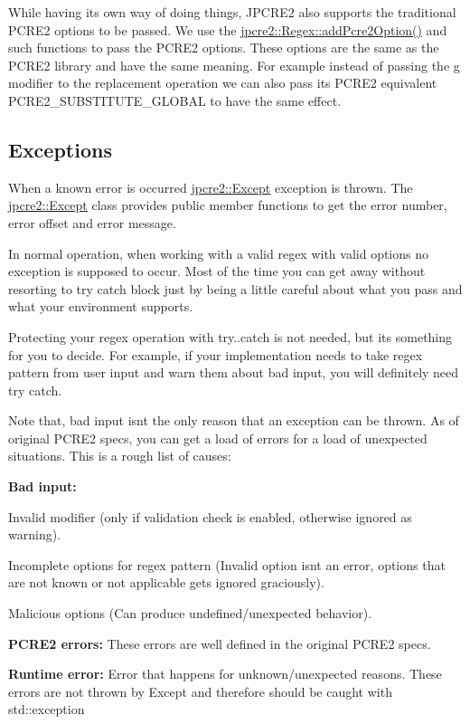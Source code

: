 While having its own way of doing things, J\+P\+C\+R\+E2 also supports the traditional P\+C\+R\+E2 options to be passed. We use the {\ttfamily \hyperlink{classjpcre2_1_1Regex_a2c7dcf12f26b2b046e147b013c8b5087_a2c7dcf12f26b2b046e147b013c8b5087}{jpcre2\+::\+Regex\+::add\+Pcre2\+Option()}} and such functions to pass the P\+C\+R\+E2 options. These options are the same as the P\+C\+R\+E2 library and have the same meaning. For example instead of passing the \textquotesingle{}g\textquotesingle{} modifier to the replacement operation we can also pass its P\+C\+R\+E2 equivalent {\ttfamily P\+C\+R\+E2\+\_\+\+S\+U\+B\+S\+T\+I\+T\+U\+T\+E\+\_\+\+G\+L\+O\+B\+AL} to have the same effect.\hypertarget{index_exceptions}{}\subsection{Exceptions}\label{index_exceptions}
When a known error is occurred \hyperlink{classjpcre2_1_1Except}{jpcre2\+::\+Except} exception is thrown. The \hyperlink{classjpcre2_1_1Except}{jpcre2\+::\+Except} class provides public member functions to get the error number, error offset and error message.

In normal operation, when working with a valid regex with valid options no exception is supposed to occur. Most of the time you can get away without resorting to try catch block just by being a little careful about what you pass and what your environment supports.

Protecting your regex operation with try..catch is not needed, but it\textquotesingle{}s something for you to decide. For example, if your implementation needs to take regex pattern from user input and warn them about bad input, you will definitely need try catch.

Note that, bad input isn\textquotesingle{}t the only reason that an exception can be thrown. As of original P\+C\+R\+E2 specs, you can get a load of errors for a load of unexpected situations. This is a rough list of causes\+:


\begin{DoxyEnumerate}
\item {\bfseries Bad input\+:}
\begin{DoxyEnumerate}
\item Invalid modifier (only if validation check is enabled, otherwise ignored as warning).
\item Incomplete options for regex pattern (Invalid option isn\textquotesingle{}t an error, options that are not known or not applicable gets ignored graciously).
\item Malicious options (Can produce undefined/unexpected behavior).
\end{DoxyEnumerate}
\item {\bfseries P\+C\+R\+E2 errors\+:} These errors are well defined in the original P\+C\+R\+E2 specs.
\item {\bfseries Runtime error\+:} Error that happens for unknown/unexpected reasons. These errors are not thrown by Except and therefore should be caught with std\+::exception
\end{DoxyEnumerate}

